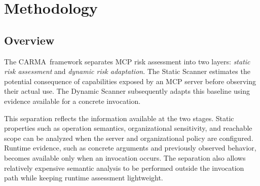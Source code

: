 \documentclass[sigconf]{acmart}
\newcommand{\frameworkname}{\textsc{CARMA}}
\begin{document}





\section{Methodology}
\label{sec:framework}

\subsection{Overview}

The \frameworkname\ framework separates MCP risk assessment into two layers:
\emph{static risk assessment} and \emph{dynamic risk adaptation}. The Static
Scanner estimates the potential consequence of capabilities exposed by an MCP
server before observing their actual use. The Dynamic Scanner subsequently
adapts this baseline using evidence available for a concrete invocation.

This separation reflects the information available at the two stages. Static
properties such as operation semantics, organizational sensitivity, and
reachable scope can be analyzed when the server and organizational policy are
configured. Runtime evidence, such as concrete arguments and previously
observed behavior, becomes available only when an invocation occurs. The
separation also allows relatively expensive semantic analysis to be performed
outside the invocation path while keeping runtime assessment lightweight.

\end{document}
